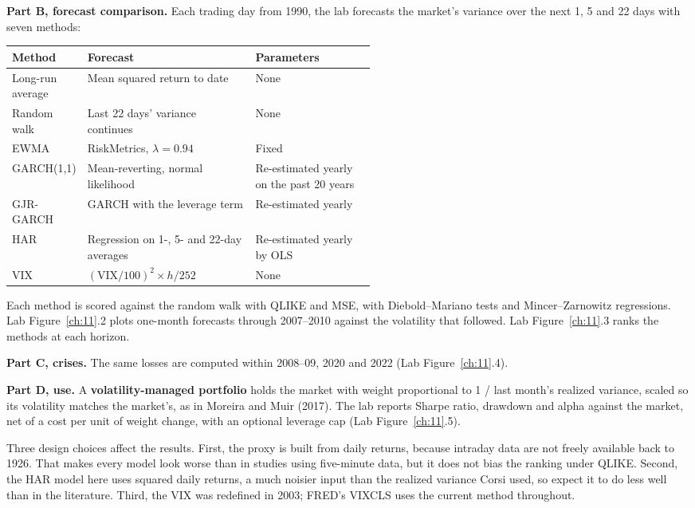 \textbf{Part B, forecast comparison.} Each trading day from 1990, the lab forecasts the market's variance over the next 1, 5 and 22 days with seven methods:

\begin{center}
\small
\begin{tabularx}{0.9\linewidth}{@{}>{\raggedright\arraybackslash}p{0.20\linewidth}>{\raggedright\arraybackslash}X>{\raggedright\arraybackslash}p{0.33\linewidth}@{}}
\toprule
Method & Forecast & Parameters \\
\midrule
Long-run average & Mean squared return to date & None \\
Random walk & Last 22 days' variance continues & None \\
EWMA & RiskMetrics, $\lambda = 0.94$ & Fixed \\
GARCH(1,1) & Mean-reverting, normal likelihood & Re-estimated yearly on the past 20 years \\
GJR-GARCH & GARCH with the leverage term & Re-estimated yearly \\
HAR & Regression on 1-, 5- and 22-day averages & Re-estimated yearly by OLS \\
VIX & $(\mathrm{VIX}/100)^2 \times h/252$ & None \\
\bottomrule
\end{tabularx}
\end{center}

Each method is scored against the random walk with QLIKE and MSE, with Diebold--Mariano tests and Mincer--Zarnowitz regressions. Lab Figure~\ref{ch:11}.2 plots one-month forecasts through 2007--2010 against the volatility that followed. Lab Figure~\ref{ch:11}.3 ranks the methods at each horizon.

\textbf{Part C, crises.} The same losses are computed within 2008--09, 2020 and 2022 (Lab Figure~\ref{ch:11}.4).

\textbf{Part D, use.} A \textbf{volatility-managed portfolio} holds the market with weight proportional to 1 / last month's realized variance, scaled so its volatility matches the market's, as in Moreira and Muir (2017). The lab reports Sharpe ratio, drawdown and alpha against the market, net of a cost per unit of weight change, with an optional leverage cap (Lab Figure~\ref{ch:11}.5).

Three design choices affect the results. First, the proxy is built from daily returns, because intraday data are not freely available back to 1926. That makes every model look worse than in studies using five-minute data, but it does not bias the ranking under QLIKE. Second, the HAR model here uses squared daily returns, a much noisier input than the realized variance Corsi used, so expect it to do less well than in the literature. Third, the VIX was redefined in 2003; FRED's VIXCLS uses the current method throughout.


